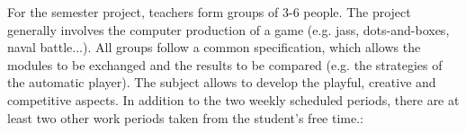For the semester project, teachers form groups of 3-6 people. The project generally involves the computer production of a game (e.g. jass, dots-and-boxes, naval battle...). All groups follow a common specification, which allows the modules to be exchanged and the results to be compared (e.g. the strategies of the automatic player). The subject allows to develop the playful, creative and competitive aspects. In addition to the two weekly scheduled periods, there are at least two other work periods taken from the student's free time.: